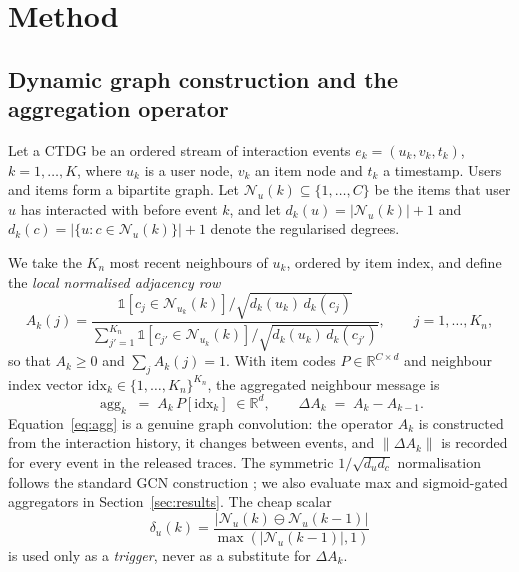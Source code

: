 \documentclass[preprint,12pt]{elsarticle}
\begin{document}
\section{Method}
\label{sec:method}

\subsection{Dynamic graph construction and the aggregation operator}
\label{sec:graph}

Let a CTDG be an ordered stream of interaction events $e_k=(u_k,v_k,t_k)$, $k=1,\ldots,K$, where $u_k$ is a user node, $v_k$ an item node and $t_k$ a timestamp. Users and items form a bipartite graph. Let $\mathcal N_u(k)\subseteq\{1,\ldots,C\}$ be the items that user $u$ has interacted with before event $k$, and let $d_k(u)=|\mathcal N_u(k)|+1$ and $d_k(c)=|\{u: c\in\mathcal N_u(k)\}|+1$ denote the regularised degrees.

We take the $K_n$ most recent neighbours of $u_k$, ordered by item index, and define the \emph{local normalised adjacency row}
\begin{equation}
A_k(j)=\frac{\mathbb 1[c_j\in\mathcal N_{u_k}(k)]\big/\sqrt{d_k(u_k)\,d_k(c_j)}}
{\sum_{j'=1}^{K_n}\mathbb 1[c_{j'}\in\mathcal N_{u_k}(k)]/\sqrt{d_k(u_k)\,d_k(c_{j'})}},
\qquad j=1,\ldots,K_n,
\label{eq:adj}
\end{equation}
so that $A_k\ge 0$ and $\sum_j A_k(j)=1$. With item codes $P\in\mathbb R^{C\times d}$ and neighbour index vector $\mathrm{idx}_k\in\{1,\ldots,K_n\}^{K_n}$, the aggregated neighbour message is
\begin{equation}
\operatorname{agg}_k \;=\; A_k\,P[\mathrm{idx}_k]\;\in\mathbb R^{d},
\qquad \Delta A_k \;=\; A_k-A_{k-1}.
\label{eq:agg}
\end{equation}
Equation~\eqref{eq:agg} is a genuine graph convolution: the operator $A_k$ is constructed from the interaction history, it changes between events, and $\|\Delta A_k\|$ is recorded for every event in the released traces. The symmetric $1/\sqrt{d_u d_c}$ normalisation follows the standard GCN construction \cite{kipf2017gcn}; we also evaluate max and sigmoid-gated aggregators in Section~\ref{sec:results}. The cheap scalar
\begin{equation}
\delta_{u}(k)=\frac{|\mathcal N_u(k)\ominus\mathcal N_u(k-1)|}{\max(|\mathcal N_u(k-1)|,1)}
\label{eq:delta}
\end{equation}
is used only as a \emph{trigger}, never as a substitute for $\Delta A_k$.
\end{document}
